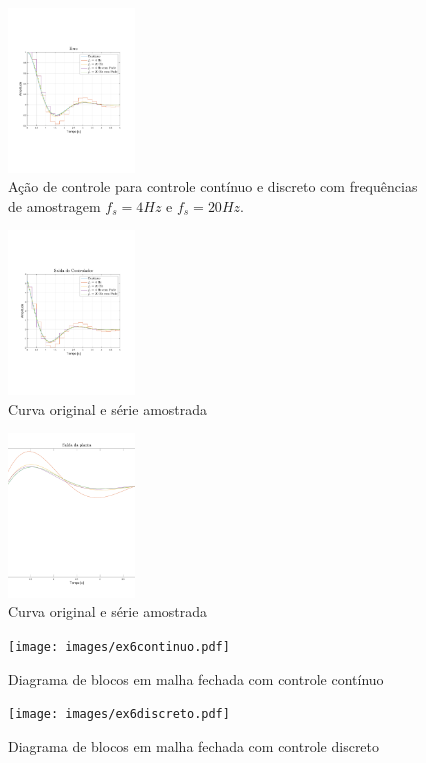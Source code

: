     \newpage
    
    \begin{figure}[H]
	\center
	\includegraphics[trim=200 200 200 200, width=0.3\textwidth]{images/saidazoh.pdf}
	\caption{Ação de controle para controle contínuo e discreto com frequências de amostragem $f_s = 4 Hz$ e $f_s = 20 Hz$. }
	\label{fig:ex6controle}
    \end{figure}
    
    \begin{figure}[H]
	\center
	\includegraphics[trim=200 200 200 200, width=0.3\textwidth]{images/controlezoh.pdf}
	\caption{Curva original e série amostrada}
	\label{fig:ex6saida}
    \end{figure}
    
    \begin{figure}[H]
	\center
	\includegraphics[trim=200 200 200 200, width=0.3\textwidth]{images/errozoh.pdf}
	\caption{Curva original e série amostrada}
	\label{fig:ex6erro}
    \end{figure}
    
    \begin{figure}[H]
	\center
	\texttt{[image: images/ex6continuo.pdf]}
	\caption{Diagrama de blocos em malha fechada com controle contínuo}
	\label{fig:ex6continuo}
    \end{figure}
    
    \begin{figure}[H]
	\center
	\texttt{[image: images/ex6discreto.pdf]}
	\caption{Diagrama de blocos em malha fechada com controle discreto}
	\label{fig:ex6discreto}
    \end{figure}